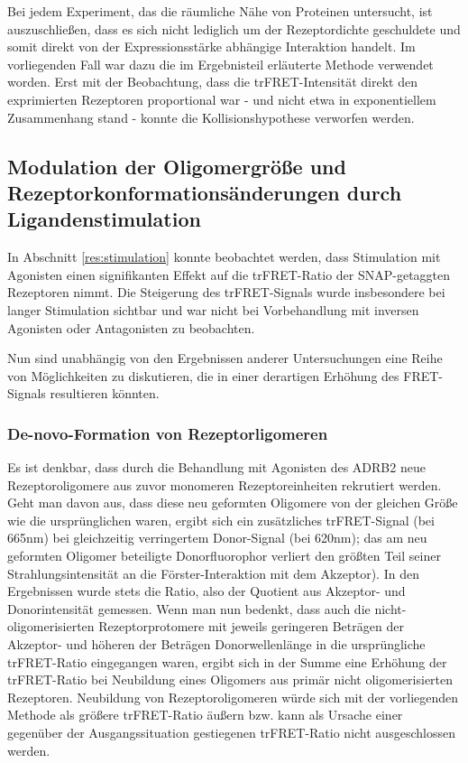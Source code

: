 Bei jedem Experiment, das die räumliche Nähe von Proteinen untersucht, ist auszuschließen, dass es sich nicht lediglich um der Rezeptordichte geschuldete und somit direkt von der Expressionsstärke abhängige Interaktion handelt. Im vorliegenden Fall war dazu die im Ergebnisteil erläuterte Methode verwendet worden. Erst mit der Beobachtung, dass die trFRET-Intensität direkt den exprimierten Rezeptoren proportional war - und nicht etwa in exponentiellem Zusammenhang stand - konnte die Kollisionshypothese verworfen werden.



\subsection{Modulation der Oligomergröße und Rezeptorkonformationsänderungen durch Ligandenstimulation}
\label{dis:stimulation}
In Abschnitt \ref{res:stimulation} konnte beobachtet werden, dass Stimulation mit Agonisten einen signifikanten Effekt auf die trFRET-Ratio der SNAP-getaggten Rezeptoren nimmt. Die Steigerung des trFRET-Signals wurde insbesondere bei langer Stimulation sichtbar und war nicht bei Vorbehandlung mit inversen Agonisten oder Antagonisten zu beobachten.

Nun sind unabhängig von den Ergebnissen anderer Untersuchungen eine Reihe von Möglichkeiten zu diskutieren, die in einer derartigen Erhöhung des FRET-Signals resultieren könnten. 

\subsubsection{De-novo-Formation von Rezeptorligomeren}
Es ist denkbar, dass durch die Behandlung mit Agonisten des ADRB2 neue Rezeptoroligomere aus zuvor monomeren Rezeptoreinheiten rekrutiert werden. Geht man davon aus, dass diese neu geformten Oligomere von der gleichen Größe wie die ursprünglichen waren, ergibt sich ein zusätzliches trFRET-Signal (bei 665\si{\nano\meter}) bei gleichzeitig verringertem Donor-Signal (bei 620\si{\nano\meter}); das am neu geformten Oligomer beteiligte Donorfluorophor verliert den größten Teil seiner Strahlungsintensität an die Förster-Interaktion mit dem Akzeptor). In den Ergebnissen wurde stets die Ratio, also der Quotient aus Akzeptor- und Donorintensität gemessen. Wenn man nun bedenkt, dass auch die nicht-oligomerisierten Rezeptorprotomere mit jeweils geringeren Beträgen der Akzeptor- und höheren der Beträgen Donorwellenlänge in die ursprüngliche trFRET-Ratio eingegangen waren, ergibt sich in der Summe eine Erhöhung der trFRET-Ratio bei Neubildung eines Oligomers aus primär nicht oligomerisierten Rezeptoren. Neubildung von Rezeptoroligomeren würde sich mit der vorliegenden Methode als größere trFRET-Ratio äußern bzw. kann als Ursache einer gegenüber der Ausgangssituation gestiegenen trFRET-Ratio nicht ausgeschlossen werden.

